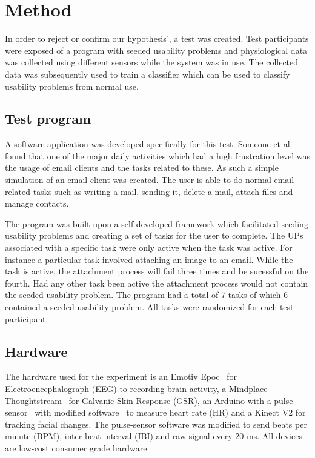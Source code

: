 
\section{Method}
In order to reject or confirm our hypothesis', a test was created. 
Test participants were exposed of a program with seeded usability problems and physiological data was collected using different sensors while the system was in use. 
The collected data was subsequently used to train a classifier which can be used to classify usability problems from normal use.

\subsection{Test program}
A software application was developed specifically for this test. 
Someone et al. found that one of the major daily activities which had a high frustration level was the usage of email clients and the tasks related to these. 
As such a simple simulation of an email client was created. 
The user is able to do normal email-related tasks such as writing a mail, sending it, delete a mail, attach files and manage contacts. 

The program was built upon a self developed framework which facilitated seeding usability problems and creating a set of tasks for the user to complete. 
The UPs associated with a specific task were only active when the task was active. 
For instance a particular task involved attaching an image to an email. 
While the task is active, the attachment process will fail three times and be sucessful on the fourth. 
Had any other task been active the attachment process would not contain the seeded usability problem.
The program had a total of 7 tasks of which 6 contained a seeded usability problem. 
All tasks were randomized for each test participant.

\subsection{Hardware}
The hardware used for the experiment is an Emotiv Epoc~\cite{emotiv_epoc_website} for Electroencephalograph (EEG) to recording brain activity, a Mindplace Thoughtstream~\cite{thoughtstream} for Galvanic Skin Response (GSR), an Arduino with a pulse-sensor~\cite{pulsesensor} with modified software~\cite{pulsesensorgit} to measure heart rate (HR) and a Kinect V2\cite{kinect_specs3} for tracking facial changes.
The pulse-sensor software was modified to send beats per minute (BPM), inter-beat interval (IBI) and raw signal every 20 ms.
All devices are low-cost consumer grade hardware.

